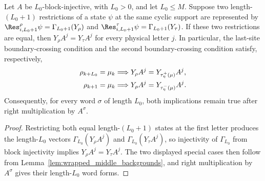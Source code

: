 \begin{lemma}
    \label{lem:boundary_assignment_first_letter_products}
    \leanok
    Let $A$ be $L_0$-block-injective, with $L_0>0$, and let $L_0\le M$.
    Suppose two length-$(L_0+1)$ restrictions of a state $\psi$ at the same
    cyclic support are represented by
    $\Res^\rho_{i,L_0+1}\psi=\Gamma_{L_0+1}(Y_\rho)$ and
    $\Res^\tau_{i,L_0+1}\psi=\Gamma_{L_0+1}(Y_\tau)$. If these two restrictions
    are equal, then $Y_\rho A^j=Y_\tau A^j$ for every physical letter $j$.
    In particular, the last-site boundary-crossing condition and the second
    boundary-crossing condition satisfy, respectively,
    \begin{align}
        \rho_{k+L_0}=\mu_k
         & \Longrightarrow
        Y_\rho A^j=Y_{\tau^+_\eta(\mu)}A^j, \notag \\
        \rho_{k+1}=\mu_k
         & \Longrightarrow
        Y_\rho A^j=Y_{\tau^-_\eta(\mu)}A^j. \notag
    \end{align}
    Consequently, for every word $\sigma$ of length $L_0$, both implications
    remain true after right multiplication by $A^\sigma$.
\end{lemma}

\begin{proof}
    \leanok
    Restricting both equal length-$(L_0+1)$ states at the first letter produces
    the length-$L_0$ vectors $\Gamma_{L_0}(Y_\rho A^j)$ and
    $\Gamma_{L_0}(Y_\tau A^j)$, so injectivity of $\Gamma_{L_0}$ from block
    injectivity implies $Y_\rho A^j=Y_\tau A^j$. The two displayed special
    cases then follow from Lemma~\ref{lem:wrapped_middle_backgrounds}, and
    right multiplication by $A^\sigma$ gives their length-$L_0$ word forms.
\end{proof}

